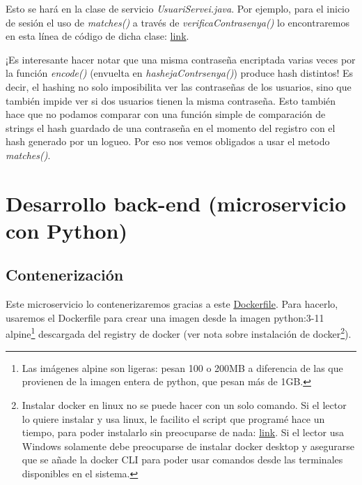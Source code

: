 \documentclass[a4paper,12pt]{report}
\begin{document}
			Esto se hará en la clase de servicio \textit{UsuariServei.java}. Por ejemplo, para el inicio de sesión el uso de \textit{matches()} a través de \textit{ verificaContrasenya()} lo encontraremos en esta línea de código de dicha clase:  \href{https://github.com/blackcub3s/mercApp/blob/e8afa7110971dca00a660bd8ec5f1a565b852fbd/APP%20WEB/__springboot__produccio__/app/src/main/java/miApp/app/Usuaris/servei/UsuariServei.java#L67}{link}.
			

			
			
			¡Es interesante hacer notar que una misma contraseña encriptada varias veces por la función \textit{encode()} (envuelta en \textit{hashejaContrsenya()}) produce hash distintos! Es decir, el hashing no solo imposibilita ver las contraseñas de los usuarios, sino que también impide ver si dos usuarios tienen la misma contraseña. Esto también hace que no podamos comparar con una función simple de comparación de strings el hash guardado de una contraseña en el momento del registro con el hash generado por un logueo. Por eso nos vemos obligados a usar el metodo \textit{matches()}.
			
			
			
			
			

			
	\section{Desarrollo back-end (microservicio con Python)}
	
	\subsection{Contenerización}
	\label{sec:conteneritzacioPython}
	
	Este microservicio lo contenerizaremos gracias a este \href{https://github.com/blackcub3s/mercApp/tree/main/APP%20WEB/__FastAPI__/Dockerfile}{Dockerfile}. Para hacerlo, usaremos el Dockerfile para crear una imagen desde la imagen python:3-11 alpine\footnote{Las imágenes alpine son ligeras: pesan 100 o 200MB a diferencia de las que provienen de la imagen entera de python, que pesan más de 1GB.} descargada del registry de docker (ver nota sobre instalación de docker\footnote{ Instalar docker en linux no se puede hacer con un solo comando. Si el lector lo quiere instalar y usa linux, le facilito el script que programé hace un tiempo, para poder instalarlo sin preocuparse de nada: \href{https://github.com/blackcub3s/mercApp/blob/main/auxiliars/instalaDocker.sh}{link}. Si el lector usa Windows solamente debe preocuparse de instalar docker desktop y asegurarse que se añade la docker CLI para poder usar comandos desde las terminales disponibles en el sistema.}). 
	
\end{document}
